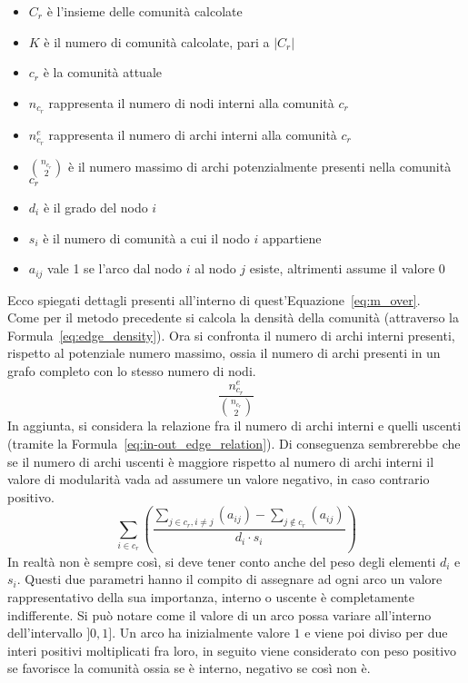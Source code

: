 \begin{itemize}
	\item $C_r$ è l'insieme delle comunità calcolate
	\item $K$ è il numero di comunità calcolate, pari a $|C_r|$
	\item $c_r$ è la comunità attuale
	\item $n_{c_r}$ rappresenta il numero di nodi interni alla comunità $c_r$
	\item $n^e_{c_r}$ rappresenta il numero di archi interni alla comunità $c_r$
	\item $\binom{n_{c_r}}{2}$ è il numero massimo di archi potenzialmente presenti nella comunità $c_r$
	\item $d_i$ è il grado del nodo $i$
	\item $s_i$ è il numero di comunità a cui il nodo $i$ appartiene
	\item $a_{ij}$ vale 1 se l'arco dal nodo $i$ al nodo $j$ esiste, altrimenti assume il valore 0
\end{itemize}
%
Ecco spiegati dettagli presenti all'interno di quest'Equazione~\ref{eq:m_over}.\\
Come per il metodo precedente si calcola la densità della comunità (attraverso la Formula~\ref{eq:edge_density}). Ora si confronta il numero di archi interni presenti, rispetto al potenziale numero massimo, ossia il numero di archi presenti in un grafo completo con lo stesso numero di nodi.
\begin{equation}
	\frac{ n^e_{c_r} }{ \binom{n_{c_r}}{2} }
	\label{eq:edge_density}
\end{equation}
%
In aggiunta, si considera la relazione fra il numero di archi interni e quelli uscenti (tramite la Formula~\ref{eq:in-out_edge_relation}). Di conseguenza sembrerebbe che se il numero di archi uscenti è maggiore rispetto al numero di archi interni il valore di modularità vada ad assumere un valore negativo, in caso contrario positivo.\\
\begin{equation}
	\sum\limits_{i \in c_r} \left( \frac{
		\sum\limits_{j \in c_r, i \neq j} \left( a_{ij} \right) - 
		\sum\limits_{j \notin c_r} \left( a_{ij} \right) 
	} {d_i \cdot s_i} \right)
	\label{eq:in-out_edge_relation}
\end{equation}
In realtà non è sempre così, si deve tener conto anche del peso degli elementi $d_i$ e $s_i$. Questi due parametri hanno il compito di assegnare ad ogni arco un valore rappresentativo della sua importanza, interno o uscente è completamente indifferente. Si può notare come il valore di un arco possa variare all'interno dell'intervallo $]0, 1]$. Un arco ha inizialmente valore $1$ e viene poi diviso per due interi positivi moltiplicati fra loro, in seguito viene considerato con peso positivo se favorisce la comunità ossia se è interno, negativo se così non è.\\
